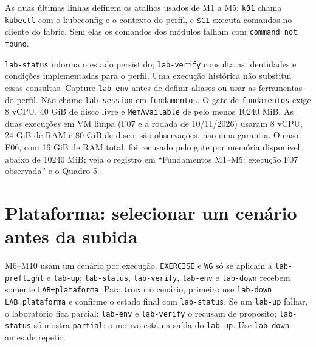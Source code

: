 \documentclass[12pt,openany,oneside,a4paper,chapter=TITLE,english,brazil]{abntex2}
\begin{document}
\begin{apendicesenv}
As duas últimas linhas definem os atalhos usados de M1 a M5: \texttt{k01} chama
\texttt{kubectl} com o kubeconfig e o contexto do perfil, e \texttt{\$C1} executa comandos no
cliente do fabric. Sem elas os comandos dos módulos falham com
\texttt{command not found}.

\texttt{lab-{}\allowbreak{}status} informa o estado persistido; \texttt{lab-{}\allowbreak{}verify} consulta as identidades
e condições implementadas para o perfil. Uma execução histórica não substitui
essas consultas. Capture \texttt{lab-{}\allowbreak{}env} antes de definir aliases ou usar as
ferramentas do perfil. Não chame \texttt{lab-{}\allowbreak{}session} em \texttt{fundamentos}. O gate de
\texttt{fundamentos} exige 8 vCPU, 40 GiB de disco livre e \texttt{Mem\allowbreak{}Available} de pelo menos
10240 MiB. As duas execuções em VM limpa (F07 e a rodada de 10/11/2026) usaram
8 vCPU, 24 GiB de RAM e 80 GiB de disco; são observações, não uma garantia. O caso F06, com 16 GiB de RAM total,
foi recusado pelo gate por memória disponível abaixo de 10240 MiB; veja o
registro em ``Fundamentos M1--M5: execução F07 observada'' e o Quadro 5.

\section*{Plataforma: selecionar um cenário antes da subida}\label{plataforma-selecionar-um-cenuxe1rio-antes-da-subida}

M6--M10 usam um cenário por execução. \texttt{EXERCISE} e \texttt{WG} só se aplicam a
\texttt{lab-{}\allowbreak{}preflight} e \texttt{lab-{}\allowbreak{}up}; \texttt{lab-{}\allowbreak{}status}, \texttt{lab-{}\allowbreak{}verify}, \texttt{lab-{}\allowbreak{}env} e \texttt{lab-{}\allowbreak{}down}
recebem somente \texttt{LAB=\allowbreak{}plataforma}. Para trocar o cenário, primeiro use
\texttt{lab-{}\allowbreak{}down LAB=\allowbreak{}plataforma} e confirme o estado final com \texttt{lab-{}\allowbreak{}status}. Se um
\texttt{lab-{}\allowbreak{}up} falhar, o laboratório fica parcial: \texttt{lab-{}\allowbreak{}env} e \texttt{lab-{}\allowbreak{}verify} o recusam
de propósito; \texttt{lab-{}\allowbreak{}status} só mostra \texttt{partial}: o motivo está na saída do \texttt{lab-{}\allowbreak{}up}. Use \texttt{lab-{}\allowbreak{}down} antes de repetir.


\end{apendicesenv}
\end{document}
